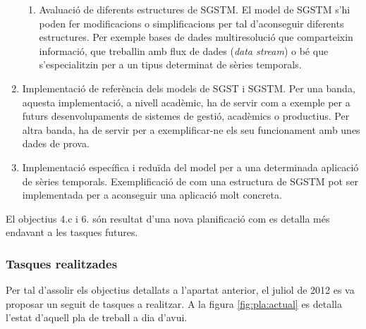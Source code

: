 \begin{enumerate}
\begin{enumerate}
  \item Avaluació de diferents estructures de SGSTM. El model de SGSTM
    s'hi poden fer modificacions o simplificacions per tal
    d'aconseguir diferents estructures.  Per exemple bases de dades
    multiresolució que comparteixin informació, que treballin amb flux
    de dades (\emph{data stream}) o bé que s'especialitzin per a un
    tipus determinat de sèries temporals.

  \end{enumerate}

\item Implementació de referència dels models de SGST i SGSTM. Per una
  banda, aquesta implementació, a nivell acadèmic, ha de servir com a
  exemple per a futurs desenvolupaments de sistemes de gestió,
  acadèmics o productius. Per altra banda, ha de servir per a
  exemplificar-ne els seu funcionament amb unes dades de prova.

\item Implementació específica i reduïda del model per a una
  determinada aplicació de sèries temporals. Exemplificació de com una
  estructura de SGSTM pot ser implementada per a aconseguir una
  aplicació molt concreta.

\end{enumerate} 


El objectius 4.c i 6. són resultat d'una nova planificació com es
detalla més endavant a les tasques futures.



\subsubsection*{Tasques realitzades}

Per tal d'assolir els objectius detallats a l'apartat anterior, el
juliol de 2012 es va proposar un seguit de tasques a realitzar.  A la
figura \ref{fig:pla:actual} es detalla l'estat d'aquell pla de treball
a dia d'avui.



